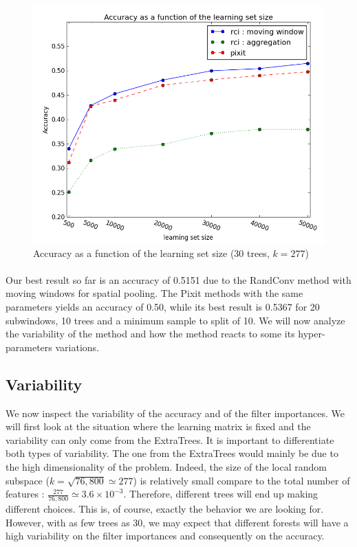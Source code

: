 \documentclass[a4paper]{report}
\begin{document}
		\begin{figure}
			\centering
				\includegraphics[width=1.0\textwidth]{images/accFLSsize.png}
			\caption{\label{fig:accFLSsize}Accuracy as a function of the learning set size (30 trees, $k=277$)}
		\end{figure}
		
		\paragraph{}
		Our best result so far is an accuracy of 0.5151 due to the RandConv method with moving windows for spatial pooling. The Pixit methods with the same parameters yields an accuracy of 0.50, while its best result is 0.5367 for 20 subwindows, 10 trees and a minimum sample to split of 10. We will now analyze the variability of the method and how the method reacts to some its hyper-parameters variations.
		
		\subsection{\label{subsec:ETDICVariability}Variability}
		We now inspect the variability of the accuracy and of the filter importances. We will first look at the situation where the learning matrix is fixed and the variability can only come from the ExtraTrees. It is important to differentiate both types of variability. The one from the ExtraTrees would mainly be due to the high dimensionality of the problem. Indeed, the size of the local random subspace ($k = \sqrt{76,800} \simeq 277$) is relatively small compare to the total number of features : $\frac{277}{76,800} \simeq 3.6 \times 10^{-3}$. Therefore, different trees will end up making different choices. This is, of course, exactly the behavior we are looking for. However, with as few trees as 30, we may expect that different forests will have a high variability on the filter importances and consequently on the accuracy.
		
\end{document}
